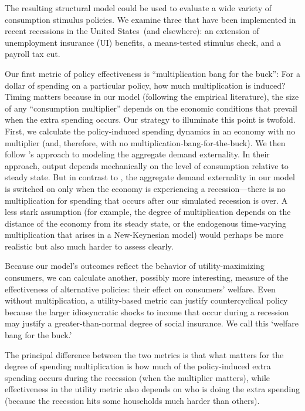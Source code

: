 \documentclass[\econtexRoot/HAFiscal]{subfiles}
\begin{document}
The resulting structural model could be used to evaluate a wide variety of consumption stimulus policies.  We examine three that have been implemented in recent recessions in the United States\ (and elsewhere): an extension of unemployment insurance (UI) benefits, a means-tested stimulus check, and a payroll tax cut.    

Our first metric of policy effectiveness is ``multiplication bang for the buck'': For a dollar of spending on a particular policy, how much multiplication is induced?  Timing matters because in our model (following the empirical literature), the size of any ``consumption multiplier'' depends on the economic conditions that prevail when the extra spending occurs.  Our strategy to illuminate this point is twofold.  First, we calculate the policy-induced spending dynamics in an economy with no multiplier (and, therefore, with no multiplication-bang-for-the-buck).  We then follow \cite{kmpHandbook2016}'s approach to modeling the aggregate demand externality.  In their approach, output depends mechanically on the level of consumption relative to steady state. But in contrast to \cite{kmpHandbook2016}, the aggregate demand externality in our model is switched on only when the economy is experiencing a recession---there is no multiplication for spending that occurs after our simulated recession is over.  A less stark assumption (for example, the degree of multiplication depends on the distance of the economy from its steady state, or the endogenous time-varying multiplication that arises in a New-Keynesian model) would perhaps be more realistic but also much harder to assess clearly.

Because our model's outcomes reflect the behavior of utility-maximizing consumers, we can calculate another, possibly more interesting, measure of the effectiveness of alternative policies:  their effect on consumers' welfare.  Even without multiplication, a utility-based metric can justify countercyclical policy because the larger idiosyncratic shocks to income that occur during a recession may justify a greater-than-normal degree of social insurance.  We call this `welfare bang for the buck.'

The principal difference between the two metrics is that what matters for the degree of spending multiplication is how much of the policy-induced extra spending occurs during the recession (when the multiplier matters), while effectiveness in the utility metric also depends on who is doing the extra spending (because the recession hits some households much harder than others).
\end{document}
